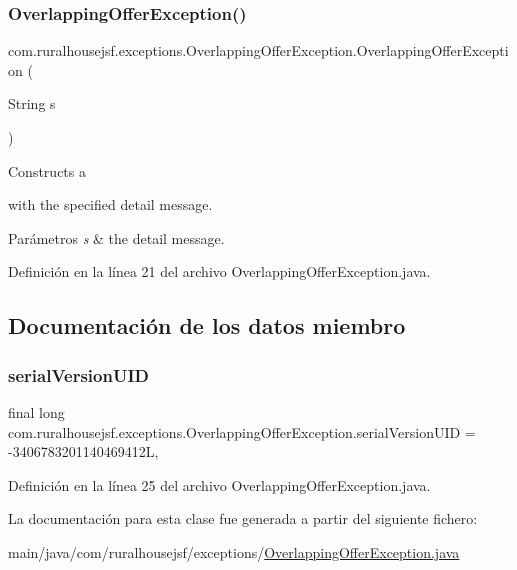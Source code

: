 \subsubsection{\texorpdfstring{OverlappingOfferException()}{OverlappingOfferException()}\hspace{0.1cm}{\footnotesize\ttfamily [2/2]}}
{\footnotesize\ttfamily com.\+ruralhousejsf.\+exceptions.\+Overlapping\+Offer\+Exception.\+Overlapping\+Offer\+Exception (\begin{DoxyParamCaption}\item[{String}]{s }\end{DoxyParamCaption})}

Constructs a
\begin{DoxyCode}{0}
\end{DoxyCode}
 with the specified detail message.


\begin{DoxyParams}{Parámetros}
{\em s} & the detail message. \\
\hline
\end{DoxyParams}


Definición en la línea 21 del archivo Overlapping\+Offer\+Exception.\+java.



\subsection{Documentación de los datos miembro}
\mbox{\label{classcom_1_1ruralhousejsf_1_1exceptions_1_1_overlapping_offer_exception_aaff379d27ee36188b92cd4ed2ee2010e}} 
\subsubsection{\texorpdfstring{serialVersionUID}{serialVersionUID}}
{\footnotesize\ttfamily final long com.\+ruralhousejsf.\+exceptions.\+Overlapping\+Offer\+Exception.\+serial\+Version\+U\+ID = -\/3406783201140469412L\hspace{0.3cm}{\ttfamily [static]}, {\ttfamily [private]}}



Definición en la línea 25 del archivo Overlapping\+Offer\+Exception.\+java.



La documentación para esta clase fue generada a partir del siguiente fichero\+:\begin{DoxyCompactItemize}
\item 
main/java/com/ruralhousejsf/exceptions/\mbox{\hyperlink{_overlapping_offer_exception_8java}{Overlapping\+Offer\+Exception.\+java}}\end{DoxyCompactItemize}
